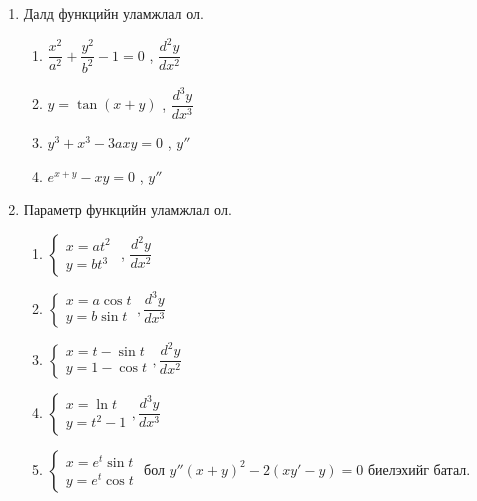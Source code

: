 \begin{enumerate}
\begin{enumerate}
  \item $y = e^{ax}$
  \item $y = e^{-x}$
  \item $y = \sin^2x$
  \item $y = xe^x$
  \item $y = x\ln x$
  \item $y = (x^2+x-1)\cos x$
  \item $y = e^{x}\cos x$
  \item $y = x^{n-1}e^{\frac{1}{x}}$
\end{enumerate}
\item Далд функцийн уламжлал ол.
\begin{enumerate}
    \item $\dfrac{x^2}{a^2}+\dfrac{y^2}{b^2}-1=0$ , $\dfrac{d^2y}{dx^2}$
    \item $y=\tan(x+y)$ , $\dfrac{d^3y}{dx^3}$
    \item $y^3+x^3-3axy=0$ , $y''$
    \item $e^{x+y}-xy=0$ , $y''$
\end{enumerate}
\item Параметр функцийн уламжлал ол.
\begin{enumerate}
    \item
    $\begin{cases}
        x=at^2\\
        y=bt^3
    \end{cases}$ , $\dfrac{d^2y}{dx^2}$
      \item 
     $ \begin{cases}
        x=a\cos t\\
        y=b\sin t
    \end{cases} , \dfrac{d^3y}{dx^3}$
      \item 
      $\begin{cases}
        x=t-\sin t\\
        y=1-\cos t
    \end{cases} , \dfrac{d^2y}{dx^2}$
      \item 
      $\begin{cases}
        x=\ln t\\
        y=t^2-1
    \end{cases} , \dfrac{d^3y}{dx^3}$  
    \item 
    $\begin{cases}
        x=e^t\sin t\\
        y=e^t\cos t
    \end{cases}$ бол $y''(x+y)^2-2(xy'-y)=0$ биелэхийг батал.
\end{enumerate}
\end{enumerate}
\newpage
